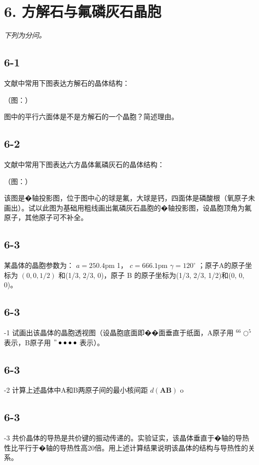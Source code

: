 \section*{6. 方解石与氟磷灰石晶胞}
\textit{下列为分问。}

\subsection*{6-1}
⽂献中常⽤下图表达⽅解⽯的晶体结构：

（图：）

图中的平⾏六⾯体是不是⽅解⽯的⼀个晶胞？简述理由。

\subsection*{6-2}
⽂献中常⽤下图表达六⽅晶体氟磷灰⽯的晶体结构：

（图：）

该图是�轴投影图，位于图中⼼的球是氟，⼤球是钙，四⾯体是磷酸根（氧原⼦未画出）。试以此图为基础⽤粗线画出氟磷灰⽯晶胞的�轴投影图，设晶胞顶⻆为氟原⼦，其他原⼦可不补全。

\subsection*{6-3}
某晶体的晶胞参数为： $a = 2 5 0 . 4 \mathrm { p m }$ 1， $c = 6 6 6 . 1 \mathrm { p m }$ $\gamma = 1 2 0 ^ { \circ }$ ；原⼦A的原⼦坐标为 $( 0 , 0 , 1 / 2 )$ 和(1/3, 2/3, 0)，原⼦ B 的原⼦坐标为(1/3, 2/3, 1/2)和(0, 0, 0)。

\subsection*{6-3}
-1 试画出该晶体的晶胞透视图（设晶胞底⾯即��⾯垂直于纸⾯，A原⼦⽤ $^ { 6 6 } \bigcirc ^ { 5 }$ 表⽰，B原⼦⽤ $" \bullet \bullet \bullet \bullet$ 表⽰）。

\subsection*{6-3}
-2 计算上述晶体中A和B两原⼦间的最⼩核间距 $d ( \mathbf { A B } )$ o

\subsection*{6-3}
-3 共价晶体的导热是共价键的振动传递的。实验证实，该晶体垂直于�轴的导热性⽐平⾏于�轴的导热性⾼20倍。⽤上述计算结果说明该晶体的结构与导热性的关系。
